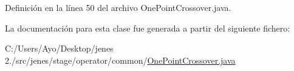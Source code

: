 Definición en la línea 50 del archivo One\-Point\-Crossover.\-java.



La documentación para esta clase fue generada a partir del siguiente fichero\-:\begin{DoxyCompactItemize}
\item 
C\-:/\-Users/\-Ayo/\-Desktop/jenes 2./src/jenes/stage/operator/common/\hyperlink{_one_point_crossover_8java}{One\-Point\-Crossover.\-java}\end{DoxyCompactItemize}

